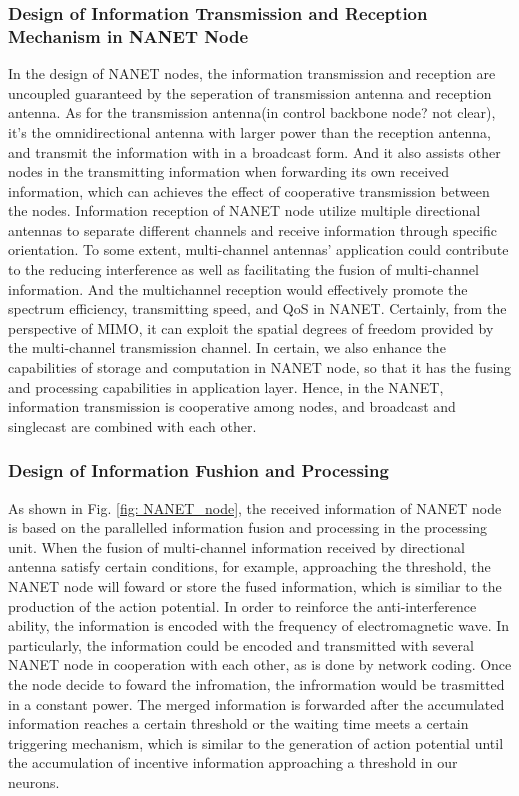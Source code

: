\documentclass[journal,comsoc]{IEEEtran}
\begin{document}
			\subsubsection{Design of Information Transmission and Reception Mechanism in NANET Node}
				In the design of NANET nodes, the information transmission and reception are uncoupled guaranteed by the seperation of transmission antenna and reception antenna.
				As for the transmission antenna(in control backbone node? not clear), it's the omnidirectional antenna with larger power than the reception antenna, and transmit the information with in a broadcast form. 
				And it also assists other nodes in the transmitting information when forwarding its own received information, which can achieves the effect of cooperative transmission between the nodes.
				Information reception of NANET node utilize multiple directional antennas to separate different channels and receive information through specific orientation. 
				To some extent, multi-channel antennas' application could contribute to the reducing interference as well as facilitating the fusion of multi-channel information.
				And the multichannel reception would effectively promote the spectrum efficiency, transmitting speed, and QoS in NANET.
				Certainly, from the perspective of MIMO, it can exploit the spatial degrees of freedom provided by the multi-channel transmission channel.
				In certain, we also enhance the capabilities of storage and computation  in NANET node, so that it has the fusing and processing capabilities in application layer.
				Hence, in the NANET, information transmission is cooperative among nodes,  and broadcast and singlecast are combined with each other.
				
			\subsubsection{Design of Information Fushion and Processing}
				As shown in Fig. \ref{fig: NANET_node}, the received information of NANET node is based on the parallelled information fusion and processing in the processing unit.
				When the fusion of multi-channel information received by directional antenna satisfy certain conditions, for example, approaching the threshold, 
				the NANET node will foward or store the fused information, which is similiar to the production of the action potential.
				In order to reinforce the anti-interference ability, the information is encoded with the frequency of electromagnetic wave.
				In particularly, the information could be encoded and transmitted with several NANET node in cooperation with each other, as is done by network coding.
				Once the node decide to foward the infromation, the infrormation would be trasmitted in a constant power.
				The merged information is forwarded after the accumulated information reaches a certain threshold or the waiting time meets a certain triggering mechanism, 
				which is similar to the generation of action potential until the accumulation of incentive information approaching a threshold in our neurons.
				
\end{document}
